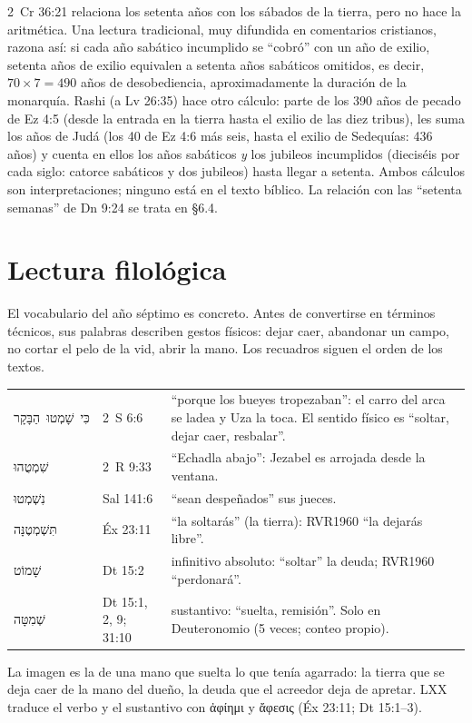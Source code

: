 \documentclass[11pt,letterpaper]{article}
\newcommand{\heb}[1]{\mbox{\foreignlanguage{hebrew}{#1}}}
\newcommand{\grc}[1]{\foreignlanguage{ancientgreek}{#1}}
\begin{document}
\begin{nota}
2~Cr 36:21 relaciona los setenta años con los sábados de la tierra, pero no hace la aritmética. Una lectura tradicional, muy difundida en comentarios cristianos, razona así: si cada año sabático incumplido se ``cobró'' con un año de exilio, setenta años de exilio equivalen a setenta años sabáticos omitidos, es decir, $70\times 7 = 490$ años de desobediencia, aproximadamente la duración de la monarquía. Rashi (a Lv 26:35) hace otro cálculo: parte de los 390 años de pecado de Ez 4:5 (desde la entrada en la tierra hasta el exilio de las diez tribus), les suma los años de Judá (los 40 de Ez 4:6 más seis, hasta el exilio de Sedequías: 436 años) y cuenta en ellos los años sabáticos \emph{y} los jubileos incumplidos (dieciséis por cada siglo: catorce sabáticos y dos jubileos) hasta llegar a setenta. Ambos cálculos son interpretaciones; ninguno está en el texto bíblico. La relación con las ``setenta semanas'' de Dn 9:24 se trata en §6.4.
\end{nota}

\section{Lectura filológica}

El vocabulario del año séptimo es concreto. Antes de convertirse en términos técnicos, sus palabras describen gestos físicos: dejar caer, abandonar un campo, no cortar el pelo de la vid, abrir la mano. Los recuadros siguen el orden de los textos.

\begin{filologia}[\heb{שׁמט} \emph{shamat} y \heb{שְׁמִטָּה} \emph{shemitá}]
\begin{tabular}{@{}L{3.4cm}L{2.2cm}L{9.0cm}@{}}
\heb{כִּי שָׁמְטוּ הַבָּקָר} & 2~S 6:6 & ``porque los bueyes tropezaban'': el carro del arca se ladea y Uza la toca. El sentido físico es ``soltar, dejar caer, resbalar''. \\[2pt]
\heb{שִׁמְטֻהוּ} & 2~R 9:33 & ``Echadla abajo'': Jezabel es arrojada desde la ventana. \\[2pt]
\heb{נִשְׁמְטוּ} & Sal 141:6 & ``sean despeñados'' sus jueces. \\[2pt]
\heb{תִּשְׁמְטֶנָּה} & Éx 23:11 & ``la soltarás'' (la tierra): RVR1960 ``la dejarás libre''. \\[2pt]
\heb{שָׁמוֹט} & Dt 15:2 & infinitivo absoluto: ``soltar'' la deuda; RVR1960 ``perdonará''. \\[2pt]
\heb{שְׁמִטָּה} & Dt 15:1, 2, 9; 31:10 & sustantivo: ``suelta, remisión''. Solo en Deuteronomio (5 veces; conteo propio). \\
\end{tabular}\par\smallskip
La imagen es la de una mano que suelta lo que tenía agarrado: la tierra que se deja caer de la mano del dueño, la deuda que el acreedor deja de apretar. LXX traduce el verbo y el sustantivo con \grc{ἀφίημι} y \grc{ἄφεσις} (Éx 23:11; Dt 15:1--3).
\end{filologia}
\end{document}
